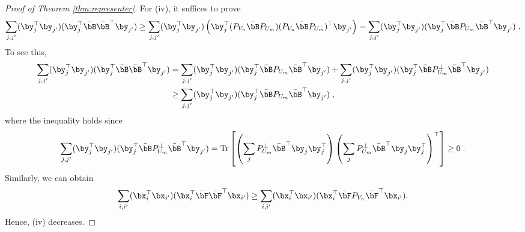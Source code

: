 \documentclass[11pt]{article}
\begin{document}
\begin{proof}[Proof of Theorem \ref{thm:representer}]
	For (iv), it suffices to prove
	\begin{equation*}
		\sum_{j, j'} (\by_j^\top \by_{j'}) (\by_{j}^\top \bar{\bB} \bar{\bB}^\top \by_{j'}) 
		\ge
		\sum_{j, j'} (\by_j^\top \by_{j'}) \left(\by_{j}^\top (P_{V_n} \bar{\bB} P_{U_m}) (P_{V_n} \bar{\bB} P_{U_m})^\top \by_{j'}\right)
		=
		\sum_{j, j'} (\by_j^\top \by_{j'}) (\by_{j}^\top \bar{\bB} P_{U_m} \bar{\bB}^\top \by_{j'}) \;.
	\end{equation*}
	To see this, 
	\begin{equation*}
		\begin{split}
			\sum_{j, j'} (\by_j^\top \by_{j'}) (\by_{j}^\top \bar{\bB} \bar{\bB}^\top \by_{j'}) 
			& =
			\sum_{j, j'} (\by_j^\top \by_{j'}) (\by_{j}^\top \bar{\bB} P_{U_m} \bar{\bB}^\top \by_{j'}) + 
			\sum_{j, j'} (\by_j^\top \by_{j'}) (\by_{j}^\top \bar{\bB} P_{U_m}^\perp \bar{\bB}^\top \by_{j'}) \\
			& \ge \sum_{j, j'} (\by_j^\top \by_{j'}) (\by_{j}^\top \bar{\bB} P_{U_m} \bar{\bB}^\top \by_{j'}) \;,
		\end{split}
	\end{equation*}
	where the inequality holds since 
	\begin{equation*}
		\sum_{j, j'} (\by_j^\top \by_{j'}) (\by_{j}^\top \bar{\bB} P_{U_m}^\perp \bar{\bB}^\top \by_{j'}) = \mathrm{Tr} \left[\left(\sum_{j} P_{U_m}^\perp \bar{\bB}^\top \by_j \by_j^\top\right) \left(\sum_{j} P_{U_m}^\perp \bar{\bB}^\top \by_j \by_j^\top\right)^\top \right] \ge 0 \;.
	\end{equation*}
	Similarly, we can obtain
	\begin{equation*}
		\sum_{i, i'} (\bx_i^\top \bx_{i'}) (\bx_i^\top \bar{\bF} \bar{\bF}^\top \bx_{i'})
		\ge 
		\sum_{i, i'} (\bx_i^\top \bx_{i'}) (\bx_i^\top \bar{\bF} P_{V_n} \bar{\bF}^\top \bx_{i'}).
	\end{equation*}
	Hence, (iv) decreases.	
	

\end{proof}
\end{document}
